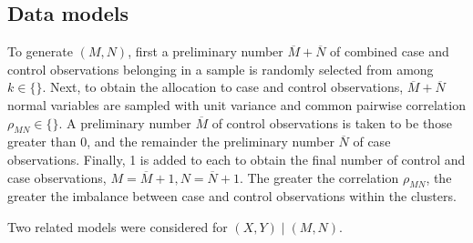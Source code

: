 \documentclass[12pt]{article}
\newcommand{\comment}[1]{
  \iftoggle{commenttoggle}{
    {\normalsize{\color{red}{ #1}}\normalsize}
  }
  {}
}
\begin{document}

\subsection{Data models}

To generate $(M,N)$, first a preliminary number
$\overline M+\overline N$ of combined case and control observations
belonging in a sample is randomly selected from among
$k\in\{\}$. Next, to obtain the allocation
to case and control observations, $\overline M+\overline N$ normal
variables are sampled with unit variance and common pairwise
correlation $\rho_{MN}\in\{\}$. A
preliminary number $\overline M$ of control observations is taken to
be those greater than $0$, and the remainder the preliminary number
$\overline N$ of case observations. Finally, 1 is added to each to
obtain the final number of control and case observations,
$M=\overline M+1,N=\overline N+1$. The greater the correlation $\rho_{MN}$, the
greater the imbalance between case and control observations within the
clusters.

Two related models were considered for $(X,Y)\mid (M,N)$.
\end{document}

